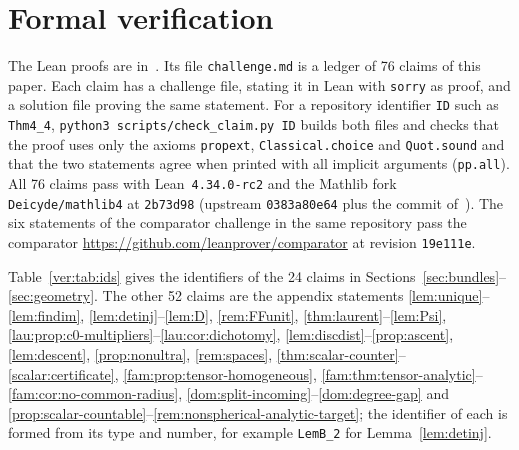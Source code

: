 \section{Formal verification}\label{sec:verification}

The Lean proofs are in~\cite{LeanP}. Its file \texttt{challenge.md} is a ledger of 76 claims of this paper. Each claim
has a challenge file, stating it in Lean with \texttt{sorry} as proof, and a solution file proving the same statement.
For a repository identifier \texttt{ID} such as \texttt{Thm4\_4}, \texttt{python3 scripts/check\_claim.py ID} builds
both files and checks that the proof uses only the axioms \texttt{propext}, \texttt{Classical.choice} and
\texttt{Quot.sound} and that the two statements agree when printed with all implicit arguments (\texttt{pp.all}). All 76
claims pass with Lean~\texttt{4.34.0-rc2} and the Mathlib fork \texttt{Deicyde/mathlib4} at \texttt{2b73d98}
(upstream \texttt{0383a80e64} plus the commit of~\cite{PR}). The six statements of the comparator challenge in the
same repository pass the comparator \url{https://github.com/leanprover/comparator} at revision \texttt{19e111e}.

Table~\ref{ver:tab:ids} gives the identifiers of the 24 claims in Sections~\ref{sec:bundles}--\ref{sec:geometry}. The
other 52 claims are the appendix statements \ref{lem:unique}--\ref{lem:findim}, \ref{lem:detinj}--\ref{lem:D},
\ref{rem:FFunit}, \ref{thm:laurent}--\ref{lem:Psi}, \ref{lau:prop:c0-multipliers}--\ref{lau:cor:dichotomy},
\ref{lem:discdist}--\ref{prop:ascent}, \ref{lem:descent}, \ref{prop:nonultra}, \ref{rem:spaces},
\ref{thm:scalar-counter}--\ref{scalar:certificate}, \ref{fam:prop:tensor-homogeneous},
\ref{fam:thm:tensor-analytic}--\ref{fam:cor:no-common-radius}, \ref{dom:split-incoming}--\ref{dom:degree-gap} and
\ref{prop:scalar-countable}--\ref{rem:nonspherical-analytic-target}; the identifier of each is formed from its type and
number, for example \texttt{LemB\_2} for Lemma~\ref{lem:detinj}.

